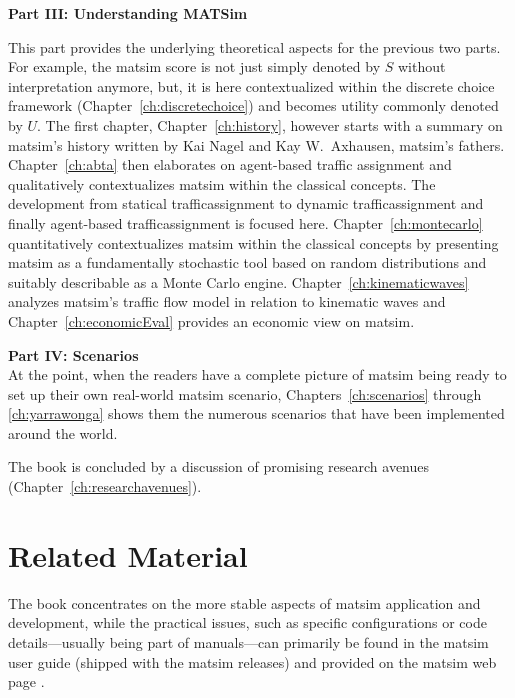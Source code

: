 \textbf{Part III: Understanding MATSim} \\


This part provides the underlying theoretical aspects for the previous two parts. For example, the \gls{matsim} \gls{score} is not just simply denoted by $S$ without interpretation anymore, but, it is here contextualized within the discrete choice framework (Chapter~\ref{ch:discretechoice}) and becomes \gls{utility} commonly denoted by $U$. 
The first chapter, Chapter~\ref{ch:history}, however starts with a summary on \gls{matsim}'s history written by Kai Nagel and Kay W.\ Axhausen, \gls{matsim}'s fathers. 
Chapter~\ref{ch:abta} then elaborates on agent-based traffic assignment and qualitatively contextualizes \gls{matsim} within the classical concepts. The development from statical \gls{trafficassignment} to dynamic \gls{trafficassignment} and finally agent-based \gls{trafficassignment} is focused here.  
Chapter~\ref{ch:montecarlo} quantitatively contextualizes \gls{matsim} within the classical concepts by presenting \gls{matsim} as a fundamentally stochastic tool based on random distributions and suitably describable as a Monte Carlo engine.
Chapter~\ref{ch:kinematicwaves} analyzes \gls{matsim}'s traffic flow model in relation to kinematic waves and Chapter~\ref{ch:economicEval} provides an economic view on \gls{matsim}. 

\textbf{Part IV: Scenarios} \\
At the point, when the readers have a complete picture of \gls{matsim} being ready to set up their own real-world \gls{matsim} \gls{scenario}, Chapters~\ref{ch:scenarios} through \ref{ch:yarrawonga} shows them the numerous scenarios that have been implemented around the world.

The book is concluded by a discussion of promising research avenues (Chapter~\ref{ch:researchavenues}).

\section*{Related Material}
The book concentrates on the more stable aspects of \gls{matsim} application and development, while the practical issues, such as specific configurations or code details---usually being part of manuals---can primarily be found in the \gls{matsim} user guide (shipped with the \gls{matsim} releases) and provided on the \gls{matsim} web page \citep[][]{MATSim_Userguide_2015}.

